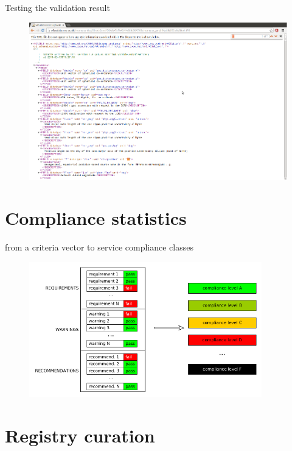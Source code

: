 \documentclass{beamer}
\begin{document}
\begin{frame}{Testing the validation result}
\begin{figure}[htbp]
    \centering
    \includegraphics[width=1.0\textwidth]{sample-sval-invocation-validation.png}
\end{figure}
\end{frame}

\section{Compliance statistics}
\begin{frame}{from a criteria vector to service compliance classes}
\begin{figure}[htbp]
    \centering
    \includegraphics[width=0.9\textwidth]{mapping-results-vectors-to-compliance-categories.png}
\end{figure}
\end{frame}

\section{Registry curation}
\end{document}
